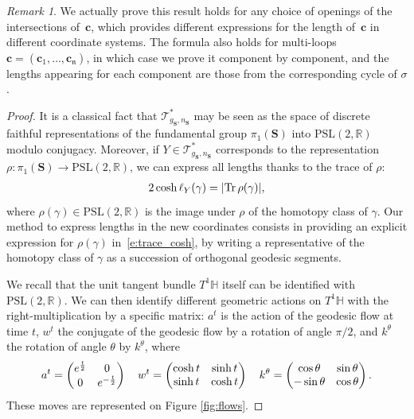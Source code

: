 \documentclass[12pt,twoside]{article}
\theoremstyle{theorem}
\theoremstyle{remark}
\newtheorem{rem}[thm]{Remark}
\theoremstyle{definition}
\theoremstyle{example}
\newcommand{\R}{\mathbb{R}}
\newcommand{\IH}{\mathbb{H}}
\def\Tr{{\rm Tr}}
\newcommand{\1}[1]{\mathds{1}_{#1}}
\let\div\relax
\newcommand{\div}[1]{\left(\frac{#1}{2}\right)}
\newcommand{\cT}{\mathcal{T}}
\newcommand{\g}{g_{\mathbf{S}}}
\newcommand{\n}{n_{\mathbf{S}}}
\newcommand{\cc}{\mathfrak{n}}
\newcommand{\curve}{\mathbf{c}}
\begin{document}
\begin{rem}
  We actually prove this result holds for any choice of openings of the intersections
  of~$\mathbf{c}$, which provides different expressions for the length of~$\mathbf{c}$ in different
  coordinate systems. The formula also holds for multi-loops
  $\curve = (\curve_1, \ldots, \curve_\cc)$, in which case we prove it component by component, and
  the lengths appearing for each component are those from the corresponding cycle of $\sigma$.
\end{rem}

\begin{proof}
  It is a classical fact that $\cT^*_{\g, \n}$ may be seen as the space of discrete faithful
  representations of the fundamental group $\pi_1(\mathbf{S})$ into $\mathrm{PSL}(2, \R)$ modulo
  conjugacy. Moreover, if $Y\in \cT^*_{\g, \n}$ corresponds to the representation
  $\rho : \pi_1(\mathbf{S}) \rightarrow \mathrm{PSL}(2, \R)$, we can express all lengths thanks to
  the trace of $\rho$:
  \begin{align} \label{e:trace_cosh}2 \cosh \div{\ell_Y(\gamma)}= |\Tr\, \rho(\gamma)|,\end{align}
  where $\rho(\gamma)\in \mathrm{PSL}(2, \R)$ is the image under $\rho$ of the homotopy class of
  $\gamma$.  Our method to express lengths in the new coordinates consists in providing an explicit
  expression for $\rho(\gamma)$ in~\eqref{e:trace_cosh}, by writing a representative of the homotopy
  class of $\gamma$ as a succession of orthogonal geodesic segments.
 

We recall that the unit tangent bundle $T^1 \IH$ itself can be identified with
$\mathrm{PSL}(2, \R)$. We can then identify different geometric actions on $T^1\IH$ with the
right-multiplication by a specific matrix: $a^t$ is the action of the geodesic flow at time $t$,
$w^t$ the conjugate of the geodesic flow by a rotation of angle $\pi/ 2$, and $k^\theta$ the
rotation of angle $\theta$ by $k^\theta$, where
\begin{align*}
  a^t =
  \begin{pmatrix}
    e^{\frac{ t}{2}} & 0 \\ 0 & e^{-\frac{t}{2}}
  \end{pmatrix}
  \quad
   w^t= 
  \begin{pmatrix}
    \cosh \div{t} & \sinh \div{t} \\ \sinh \div{t} & \cosh \div{t}
      \end{pmatrix}
  \quad
 k^\theta= 
  \begin{pmatrix}
    \cos \div{\theta} & \sin \div{\theta} \\- \sin \div{\theta} & \cos \div{\theta}
      \end{pmatrix}.
\end{align*}
      These moves are represented on Figure \ref{fig:flows}.


\end{proof}
\end{document}

